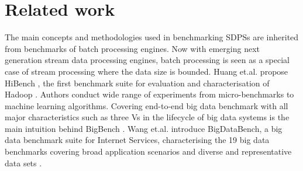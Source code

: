 \section{Related work}
\label{rel}
The main concepts and methodologies used in benchmarking SDPSs are inherited from benchmarks of  batch processing engines.
Now with emerging next generation stream data processing engines, batch processing is seen as a special case of stream processing where the data size is bounded. Huang et.al. propose HiBench \cite{huang2011hibench}, the first benchmark suite for evaluation and characterisation of Hadoop \cite{white2012hadoop}. Authors conduct wide range of experiments from micro-benchmarks to machine learning algorithms. Covering end-to-end big data benchmark with all major characteristics such as three Vs in the lifecycle of big data systems is the main intuition behind BigBench \cite{ghazal2013bigbench}. Wang et.al. introduce BigDataBench, a big data benchmark suite for Internet Services, characterising the 19 big data benchmarks covering broad application scenarios and diverse and representative data sets \cite{wang2014bigdatabench}.

